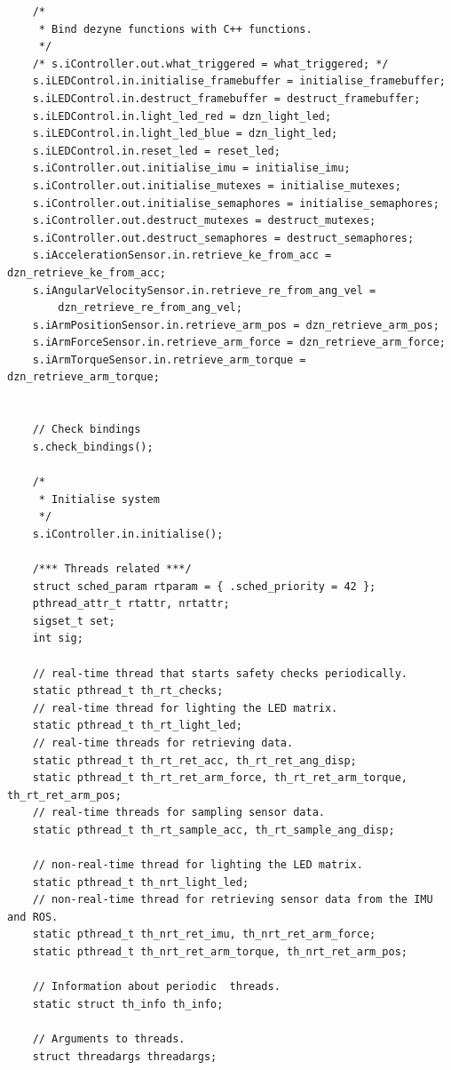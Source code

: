 \documentclass[12pt]{scrreprt}
\begin{document}
\begin{appendices}
\begin{verbatim}
    /*
     * Bind dezyne functions with C++ functions.
     */
    /* s.iController.out.what_triggered = what_triggered; */
    s.iLEDControl.in.initialise_framebuffer = initialise_framebuffer;
    s.iLEDControl.in.destruct_framebuffer = destruct_framebuffer;
    s.iLEDControl.in.light_led_red = dzn_light_led;
    s.iLEDControl.in.light_led_blue = dzn_light_led;
    s.iLEDControl.in.reset_led = reset_led;
    s.iController.out.initialise_imu = initialise_imu;
    s.iController.out.initialise_mutexes = initialise_mutexes;
    s.iController.out.initialise_semaphores = initialise_semaphores;
    s.iController.out.destruct_mutexes = destruct_mutexes;
    s.iController.out.destruct_semaphores = destruct_semaphores;
    s.iAccelerationSensor.in.retrieve_ke_from_acc = dzn_retrieve_ke_from_acc;
    s.iAngularVelocitySensor.in.retrieve_re_from_ang_vel =
        dzn_retrieve_re_from_ang_vel;
    s.iArmPositionSensor.in.retrieve_arm_pos = dzn_retrieve_arm_pos;
    s.iArmForceSensor.in.retrieve_arm_force = dzn_retrieve_arm_force;
    s.iArmTorqueSensor.in.retrieve_arm_torque = dzn_retrieve_arm_torque;


    // Check bindings
    s.check_bindings();

    /*
     * Initialise system
     */
    s.iController.in.initialise();

    /*** Threads related ***/
    struct sched_param rtparam = { .sched_priority = 42 };
    pthread_attr_t rtattr, nrtattr;
    sigset_t set;
    int sig;

    // real-time thread that starts safety checks periodically.
    static pthread_t th_rt_checks;
    // real-time thread for lighting the LED matrix.
    static pthread_t th_rt_light_led;
    // real-time threads for retrieving data.
    static pthread_t th_rt_ret_acc, th_rt_ret_ang_disp;
    static pthread_t th_rt_ret_arm_force, th_rt_ret_arm_torque, th_rt_ret_arm_pos;
    // real-time threads for sampling sensor data.
    static pthread_t th_rt_sample_acc, th_rt_sample_ang_disp;

    // non-real-time thread for lighting the LED matrix.
    static pthread_t th_nrt_light_led;
    // non-real-time thread for retrieving sensor data from the IMU and ROS.
    static pthread_t th_nrt_ret_imu, th_nrt_ret_arm_force;
    static pthread_t th_nrt_ret_arm_torque, th_nrt_ret_arm_pos;

    // Information about periodic  threads.
    static struct th_info th_info;

    // Arguments to threads.
    struct threadargs threadargs;


\end{verbatim}
\end{appendices}
\end{document}
